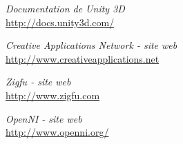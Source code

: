 \begin{thebibliography}{9}
  \emph{Documentation de Unity 3D}\\
  \url{http://docs.unity3d.com/}

  \emph{Creative Applications Network - site web}\\
  \url{http://www.creativeapplications.net}
  
  \emph{Zigfu - site web}\\
  \url{http://www.zigfu.com}

  \emph{OpenNI - site web}\\
  \url{http://www.openni.org/}
  
\end{thebibliography}
        
